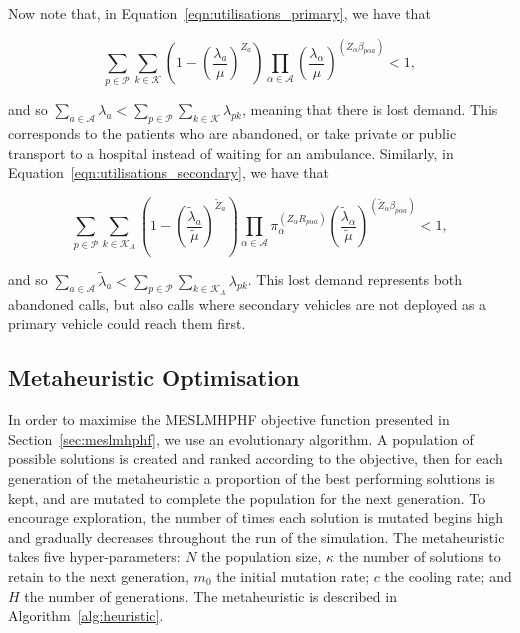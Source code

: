 \documentclass[numbers,webpdf,imaman]{ima-authoring-template}%
\begin{document}
Now note that, in Equation~\ref{eqn:utilisations_primary}, we have that

$$\sum_{p \in \mathcal{P}} \sum_{k \in \mathcal{K}} \left( 1 - \left(\frac{\lambda_a}{\mu}\right)^{Z_a} \right) \prod_{\alpha \in \mathcal{A}} \left(\frac{\lambda_{\alpha}}{\mu}\right)^{\left(Z_{\alpha} \beta_{p \alpha a}\right)} < 1,$$

\noindent
and so
$\sum_{a \in \mathcal{A}} \lambda_a < \sum_{p \in \mathcal{P}} \sum_{k \in \mathcal{K}} \lambda_{pk}$,
meaning that there is lost demand. This corresponds to the patients who are
abandoned, or take private or public transport to a hospital instead of waiting
for an ambulance. Similarly, in Equation~\ref{eqn:utilisations_secondary}, we
have that

$$\sum_{p \in \mathcal{P}} \sum_{k \in \mathcal{K}_A} \left( 1 - \left(\frac{\tilde{\lambda}_a}{\tilde{\mu}}\right)^{\tilde{Z}_a} \right) \prod_{\alpha \in \mathcal{A}} \pi_{\alpha}^{\left(Z_{\alpha} R_{p \alpha a}\right)} \left(\frac{\tilde{\lambda}_{\alpha}}{\tilde{\mu}}\right)^{ \left(\tilde{Z}_{\alpha} \beta_{p \alpha a}\right)} < 1,$$

\noindent
and so
$\sum_{a \in \mathcal{A}} \tilde{\lambda}_a < \sum_{p \in \mathcal{P}} \sum_{k \in \mathcal{K}_A} \lambda_{pk}$.
This lost demand represents both abandoned calls, but also calls where secondary
vehicles are not deployed as a primary vehicle could reach them first.



\subsection{Metaheuristic Optimisation}\label{sec:heuristic}
In order to maximise the MESLMHPHF objective function presented in
Section~\ref{sec:meslmhphf}, we use an evolutionary algorithm. A population of
possible solutions is created and ranked according to the objective, then for
each generation of the metaheuristic a proportion of the best performing
solutions is kept, and are mutated to complete the population for the next
generation. To encourage exploration, the number of times each solution is
mutated begins high and gradually decreases throughout the run of the
simulation. The metaheuristic takes five hyper-parameters: $N$ the population
size, $\kappa$ the number of solutions to retain to the next generation, $m_0$
the initial mutation rate; $c$ the cooling rate; and $H$ the number of
generations. The metaheuristic is described in Algorithm~\ref{alg:heuristic}.
\end{document}

